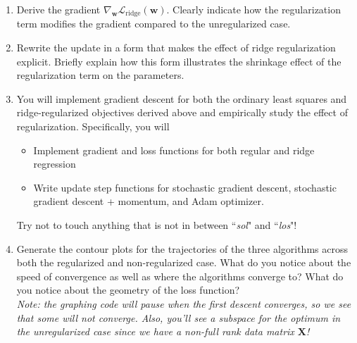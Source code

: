 \documentclass[submit]{../harvardml}
\begin{document}
\begin{problem}
\begin{enumerate}
\item Derive the gradient $\nabla_{\mathbf w}\mathcal L_\text{ridge}(\mathbf w)$. Clearly indicate how the regularization term modifies the gradient compared to the unregularized case.


\item Rewrite the update in a form that makes the effect of ridge regularization
explicit. Briefly explain how this form illustrates the shrinkage effect of the
regularization term on the parameters.

\item You will implement gradient descent for both the ordinary least squares and
ridge-regularized objectives derived above and empirically study the effect of
regularization. Specifically, you will

\begin{itemize}
    \item Implement gradient and loss functions for both regular and ridge regression
    \item Write update step functions for stochastic gradient descent, stochastic gradient descent + momentum, and Adam optimizer.
\end{itemize}

Try not to touch anything that is not in between ``\textit{sol}" and ``\textit{los}"!


\item Generate the contour plots for the trajectories of the three algorithms across both the regularized and non-regularized case. What do you notice about the speed of convergence as well as where the algorithms converge to? What do you notice about the geometry of the loss function?\\
\textit{Note: the graphing code will pause when the first descent converges, so we see that some will not converge. Also, you'll see a subspace for the optimum in the unregularized case since we have a non-full rank data matrix $\mathbf X$!}

\end{enumerate}
\end{problem}

\pagebreak
\end{document}
